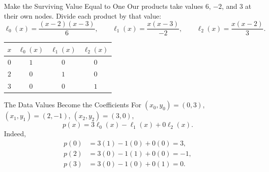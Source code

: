 \documentclass[10pt]{beamer}
\begin{document}
\begin{frame}{Make the Surviving Value Equal to One}
Our products take values $6$, $-2$, and $3$ at their own nodes.
Divide each product by that value:
\[
\ell_0(x)=\frac{(x-2)(x-3)}{6},\qquad
\ell_1(x)=\frac{x(x-3)}{-2},\qquad
\ell_2(x)=\frac{x(x-2)}{3}.
\]
\begin{center}
\renewcommand{\arraystretch}{1.3}
\begin{tabular}{c|ccc}
$x$ & $\ell_0(x)$ & $\ell_1(x)$ & $\ell_2(x)$\\ \hline
$0$ & $1$ & $0$ & $0$\\
$2$ & $0$ & $1$ & $0$\\
$3$ & $0$ & $0$ & $1$
\end{tabular}
\end{center}
\end{frame}

\begin{frame}{The Data Values Become the Coefficients}
For $(x_0,y_0)=(0,3)$, $(x_1,y_1)=(2,-1)$, $(x_2,y_2)=(3,0)$,
\[
\boxed{p(x)=3\ell_0(x)-\ell_1(x)+0\ell_2(x).}
\]
Indeed,
\begin{align*}
p(0)&=3(1)-1(0)+0(0)=3,\\
p(2)&=3(0)-1(1)+0(0)=-1,\\
p(3)&=3(0)-1(0)+0(1)=0.
\end{align*}
\end{frame}
\end{document}
